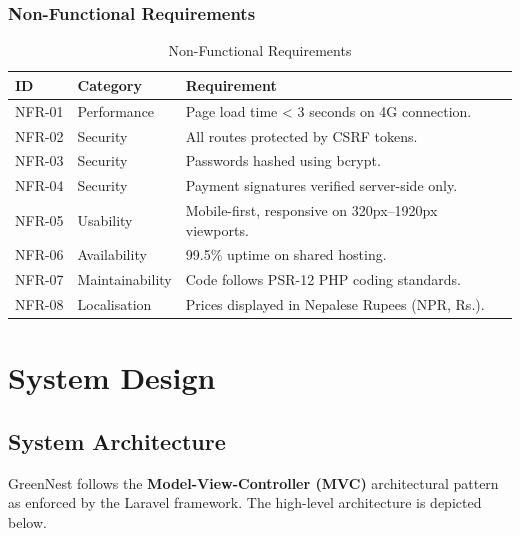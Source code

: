 \documentclass[12pt,a4paper]{report}
\begin{document}
\subsection{Non-Functional Requirements}

\begin{table}[H]
\centering
\caption{Non-Functional Requirements}
\begin{tabular}{@{}llp{8cm}@{}}
\toprule
\textbf{ID} & \textbf{Category} & \textbf{Requirement} \\
\midrule
NFR-01 & Performance    & Page load time < 3 seconds on 4G connection. \\
NFR-02 & Security       & All routes protected by CSRF tokens. \\
NFR-03 & Security       & Passwords hashed using bcrypt. \\
NFR-04 & Security       & Payment signatures verified server-side only. \\
NFR-05 & Usability      & Mobile-first, responsive on 320px–1920px viewports. \\
NFR-06 & Availability   & 99.5\% uptime on shared hosting. \\
NFR-07 & Maintainability& Code follows PSR-12 PHP coding standards. \\
NFR-08 & Localisation   & Prices displayed in Nepalese Rupees (NPR, Rs.). \\
\bottomrule
\end{tabular}
\end{table}

\chapter{System Design}

\section{System Architecture}

GreenNest follows the \textbf{Model-View-Controller (MVC)} architectural pattern as enforced by the Laravel framework. The high-level architecture is depicted below.
\end{document}
